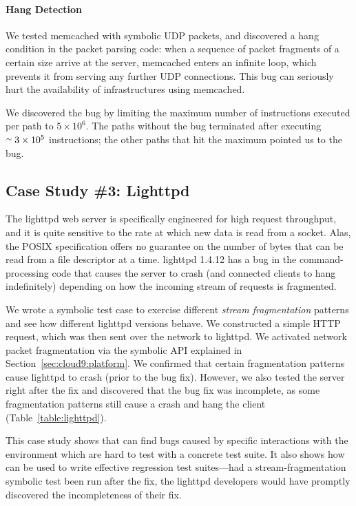 \paragraph{Hang Detection}

We tested memcached with symbolic UDP packets, and \cnine discovered a hang condition in the packet parsing code: 
when a sequence of packet fragments of a certain size arrive at the server, memcached enters an infinite loop, which prevents it from serving any further UDP connections. This bug can seriously hurt the availability of infrastructures using memcached.

We discovered the bug by limiting the maximum number of instructions executed per path to $5 \times 10^6$.  The paths without the bug terminated after executing $\stackrel{\sim}{} 3\times 10^5$ instructions; the other paths that hit the maximum pointed us to the bug.

\subsection{Case Study \#3: Lighttpd}
\label{sec:eval:lighttpd}


The lighttpd web server is specifically engineered for high request throughput, and it is quite sensitive to the rate at which new data is read from a socket.  Alas, the POSIX specification offers no guarantee on the number of bytes that can be read from a file descriptor at a time.  lighttpd 1.4.12 has a bug in the command-processing code that causes the server to crash (and connected clients to hang indefinitely) depending on how the incoming stream of requests is fragmented. 

We wrote a symbolic test case to exercise different \emph{stream fragmentation} patterns and see how different lighttpd versions behave. We constructed a simple HTTP request, which was then sent over the network to lighttpd. We activated network packet fragmentation via the symbolic   API explained in Section~\ref{sec:cloud9:platform}. We confirmed that certain fragmentation patterns cause lighttpd to crash (prior to the bug fix). However, we also tested the server right after the fix and discovered that the bug fix was incomplete, as some fragmentation patterns still cause a crash and hang the client (Table~\ref{table:lighttpd}).

This case study shows that \cnine can find bugs caused by specific interactions with the environment which are hard to test with a concrete test suite. It also shows how \cnine can be used to write effective regression test suites---had a stream-fragmentation symbolic test been run after the fix, the lighttpd developers would have promptly discovered the incompleteness of their fix.

